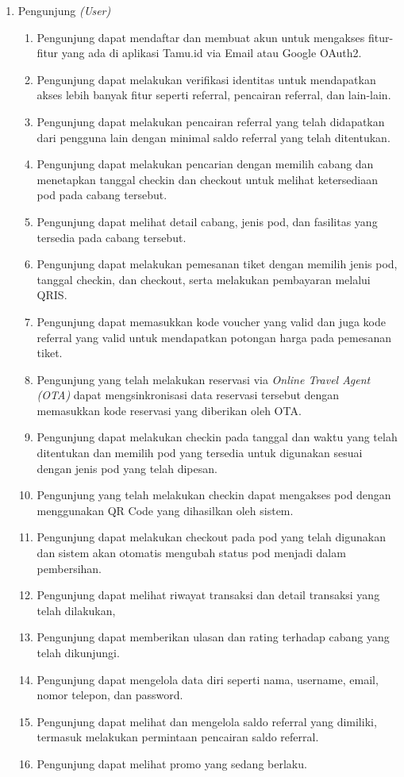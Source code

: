 \begin{enumerate}
    \item Pengunjung \textit{(User)}
          \begin{enumerate}
              \item Pengunjung dapat mendaftar dan membuat akun untuk mengakses fitur-fitur yang ada di aplikasi Tamu.id via Email atau Google OAuth2.
              \item Pengunjung dapat melakukan verifikasi identitas untuk mendapatkan akses lebih banyak fitur seperti referral, pencairan referral, dan lain-lain.
              \item Pengunjung dapat melakukan pencairan referral yang telah didapatkan dari pengguna lain dengan minimal saldo referral yang telah ditentukan.
              \item Pengunjung dapat melakukan pencarian dengan memilih cabang dan menetapkan tanggal checkin dan checkout untuk melihat ketersediaan pod pada cabang tersebut.
              \item Pengunjung dapat melihat detail cabang, jenis pod, dan fasilitas yang tersedia pada cabang tersebut.
              \item Pengunjung dapat melakukan pemesanan tiket dengan memilih jenis pod, tanggal checkin, dan checkout, serta melakukan pembayaran melalui QRIS.
              \item Pengunjung dapat memasukkan kode voucher yang valid dan juga kode referral yang valid untuk mendapatkan potongan harga pada pemesanan tiket.
              \item Pengunjung yang telah melakukan reservasi via \textit{Online Travel Agent (OTA)} dapat mengsinkronisasi data reservasi tersebut dengan memasukkan kode reservasi yang diberikan oleh OTA.
              \item Pengunjung dapat melakukan checkin pada tanggal dan waktu yang telah ditentukan dan memilih pod yang tersedia untuk digunakan sesuai dengan jenis pod yang telah dipesan.
              \item Pengunjung yang telah melakukan checkin dapat mengakses pod dengan menggunakan QR Code yang dihasilkan oleh sistem.
              \item Pengunjung dapat melakukan checkout pada pod yang telah digunakan dan sistem akan otomatis mengubah status pod menjadi dalam pembersihan.
              \item Pengunjung dapat melihat riwayat transaksi dan detail transaksi yang telah dilakukan,
              \item Pengunjung dapat memberikan ulasan dan rating terhadap cabang yang telah dikunjungi.
              \item Pengunjung dapat mengelola data diri seperti nama, username, email, nomor telepon, dan password.
              \item Pengunjung dapat melihat dan mengelola saldo referral yang dimiliki, termasuk melakukan permintaan pencairan saldo referral.
              \item Pengunjung dapat melihat promo yang sedang berlaku.
          \end{enumerate}
\end{enumerate}

